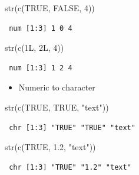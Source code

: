 \documentclass[
  letterpaper,
  DIV=11,
  numbers=noendperiod]{scrreprt}
\newenvironment{Shaded}{\begin{snugshade}}{\end{snugshade}}
\newcommand{\ConstantTok}[1]{\textcolor[rgb]{0.56,0.35,0.01}{#1}}
\newcommand{\DecValTok}[1]{\textcolor[rgb]{0.68,0.00,0.00}{#1}}
\newcommand{\FloatTok}[1]{\textcolor[rgb]{0.68,0.00,0.00}{#1}}
\newcommand{\FunctionTok}[1]{\textcolor[rgb]{0.28,0.35,0.67}{#1}}
\newcommand{\NormalTok}[1]{\textcolor[rgb]{0.00,0.23,0.31}{#1}}
\newcommand{\StringTok}[1]{\textcolor[rgb]{0.13,0.47,0.30}{#1}}
\providecommand{\tightlist}{%
  \setlength{\itemsep}{0pt}\setlength{\parskip}{0pt}}
\begin{document}
\begin{Shaded}
\begin{Highlighting}[]
\FunctionTok{str}\NormalTok{(}\FunctionTok{c}\NormalTok{(}\ConstantTok{TRUE}\NormalTok{, }\ConstantTok{FALSE}\NormalTok{, }\DecValTok{4}\NormalTok{))}
\end{Highlighting}
\end{Shaded}

\begin{verbatim}
 num [1:3] 1 0 4
\end{verbatim}

\begin{Shaded}
\begin{Highlighting}[]
\FunctionTok{str}\NormalTok{(}\FunctionTok{c}\NormalTok{(}\DecValTok{1}\NormalTok{L, }\DecValTok{2}\NormalTok{L, }\DecValTok{4}\NormalTok{))}
\end{Highlighting}
\end{Shaded}

\begin{verbatim}
 num [1:3] 1 2 4
\end{verbatim}

\begin{itemize}
\tightlist
\item
  Numeric to character
\end{itemize}

\begin{Shaded}
\begin{Highlighting}[]
\FunctionTok{str}\NormalTok{(}\FunctionTok{c}\NormalTok{(}\ConstantTok{TRUE}\NormalTok{, }\ConstantTok{TRUE}\NormalTok{, }\StringTok{"text"}\NormalTok{))}
\end{Highlighting}
\end{Shaded}

\begin{verbatim}
 chr [1:3] "TRUE" "TRUE" "text"
\end{verbatim}

\begin{Shaded}
\begin{Highlighting}[]
\FunctionTok{str}\NormalTok{(}\FunctionTok{c}\NormalTok{(}\ConstantTok{TRUE}\NormalTok{, }\FloatTok{1.2}\NormalTok{, }\StringTok{"text"}\NormalTok{))}
\end{Highlighting}
\end{Shaded}

\begin{verbatim}
 chr [1:3] "TRUE" "1.2" "text"
\end{verbatim}
\end{document}
